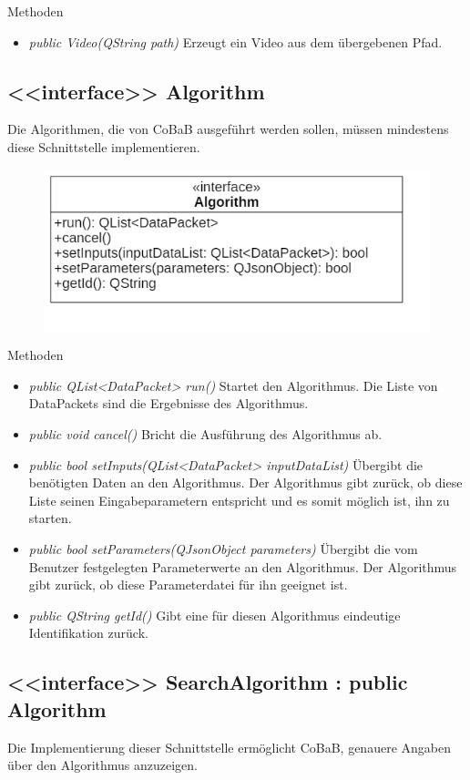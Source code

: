 Methoden
\begin{itemize}
\item \textit{public Video(QString path)} Erzeugt ein Video aus dem übergebenen Pfad.
\end{itemize}

\subsection*{<<interface>> Algorithm}
Die Algorithmen, die von CoBaB ausgeführt werden sollen, müssen mindestens diese Schnittstelle implementieren.

\begin{figure}[H]
\centering
\includegraphics[scale=0.5]{img/Klassendiagramm/Klassen/Model/Algorithm}
\label{fig:algorithm}
\end{figure}

Methoden
\begin{itemize}
\item\textit{public QList<DataPacket> run()} Startet den Algorithmus. Die Liste von DataPackets sind die Ergebnisse des Algorithmus.
\item\textit{public void cancel()} Bricht die Ausführung des Algorithmus ab.
\item\textit{public bool setInputs(QList<DataPacket> inputDataList)} Übergibt die benötigten Daten an den Algorithmus. Der Algorithmus gibt zurück, ob diese Liste seinen Eingabeparametern entspricht und es somit möglich ist, ihn zu starten.
\item\textit{public bool setParameters(QJsonObject parameters)} Übergibt die vom Benutzer festgelegten Parameterwerte an den Algorithmus. Der Algorithmus gibt zurück, ob diese Parameterdatei für ihn geeignet ist.
\item\textit{public QString getId()} Gibt eine für diesen Algorithmus eindeutige Identifikation zurück.
\end{itemize}

\subsection*{<<interface>> SearchAlgorithm : public Algorithm}
Die Implementierung dieser Schnittstelle ermöglicht CoBaB, genauere Angaben über den Algorithmus anzuzeigen.

